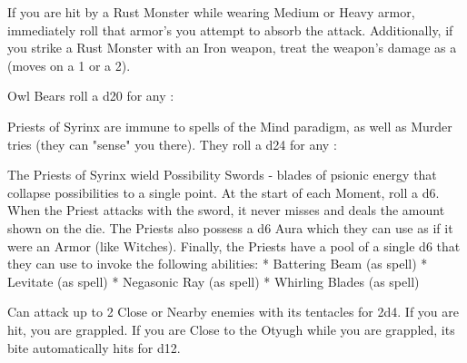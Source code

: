 {



\MONSTERBLOCK[
  Name=Rust Monster,
  Link=monster-rust-monster,
  MV=Base,
  WK=d20,
  DMG=d4 1 Close,
  HD=3,
  Power=Average,
  Soak=1,
  Morale=Orderly,
  Save=2,
  Extras={}
]
If you are hit by a Rust Monster while wearing Medium or Heavy armor, immediately roll that armor's \UD {} you attempt to absorb the attack.  Additionally, if you strike a Rust Monster with an Iron weapon, treat the weapon's damage as a \UD (moves \DCDOWN on a 1 or a 2).

\MONSTERBLOCK[
  Name=Owl Bear,
  Link=monster-owl-bear,
  MV=Base,
  WK=d12,
  DMG=d6+d8 2 Close,
  HD=5,
  Power=Strong,
  Soak=0,
  Morale=Fanatical,
  Save=3,
  Extras={Bloodthirsty}
]
Owl Bears roll a d20 for any \RB : \VIG 

\MONSTERBLOCK[
  Name=Priest of Syrinx,
  Link=monster-priest-of syrinx,
  MV=Base,
  WK=d12,
  DMG=[see below 3 Nearby,
  HD=5,
  Power=Weak,
  Soak=0,
  Morale=Cowardly,
  Save=3,
  Extras={}
]
Priests of Syrinx are immune to spells of the Mind paradigm, as well as Murder tries  (they can "sense" you there). They roll a d24 for any \RB : \INT 
  
The Priests of Syrinx wield Possibility Swords - blades of psionic energy that collapse possibilities to a single point.  At the start of each Moment, roll a d6.  When the Priest attacks with the sword, it never misses and deals the amount shown on the die. 
The Priests also possess a d6 Aura which they can use as if it were an Armor \UD (like Witches).
Finally, the Priests have a {pool} of a single d6 that they can use to invoke the following abilities:
* Battering Beam (as spell)
* Levitate (as spell)
* Negasonic Ray (as spell)
* Whirling Blades (as spell)

\MONSTERBLOCK[
  Name=Otyugh,
  Link=monster-otyugh,
  MV=Base,
  WK=d10,
  DMG=d12 / 2d4 1 Close + 2 Nearby,
  HD=7,
  Power=Average,
  Soak=0,
  Morale=Orderly,
  Save=4,
  Extras={}
]
Can attack up to 2 Close or Nearby enemies with its tentacles for 2d4.  If you are hit, you are grappled.  If you are Close to the Otyugh while you are grappled, its bite automatically hits for d12.


\MONSTERBLOCK[
  Name=Son of Kyuss,
  Link=monster-son-of kyuss,
  MV=Base,
  WK=d6,
  DMG=2d10 1 Close,
  HD=8,
  Power=Weak,
  Soak=0,
  Morale=Orderly,
  Save=5,
  Extras={Berserk, Keen}
]

}
